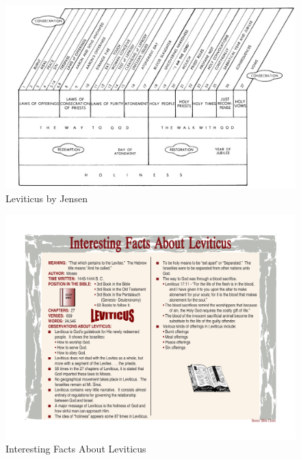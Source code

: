 \newpage
\begin{figure}
\begin{center}
\includegraphics[scale=2, angle=90]{03OT-Leviticus/References/Jensen-Leviticus.png}
\caption[Leviticus by Jensen]{Leviticus by Jensen}
\label{fig:Leviticus by Jensen}
\end{center}
\end{figure}

\newpage
\begin{figure}
\begin{center}
\includegraphics[scale=0.6, angle=90]{03OT-Leviticus/References/interestingfactsaboutleviticus.pdf}
\caption[Interesting Facts About Leviticus]{Interesting Facts About Leviticus}
\label{fig:Interesting Facts About Leviticus}
\end{center}
\end{figure}


